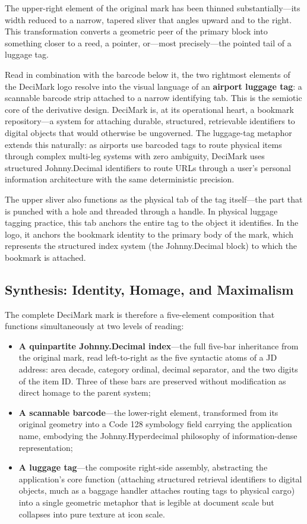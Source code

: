 \documentclass[11pt,a4paper]{book}
\begin{document}
The upper-right element of the original mark has been thinned substantially---its width reduced to a narrow, tapered sliver that angles upward and to the right. This transformation converts a geometric peer of the primary block into something closer to a reed, a pointer, or---most precisely---the pointed tail of a luggage tag.

Read in combination with the barcode below it, the two rightmost elements of the DeciMark logo resolve into the visual language of an \textbf{airport luggage tag}: a scannable barcode strip attached to a narrow identifying tab. This is the semiotic core of the derivative design. DeciMark is, at its operational heart, a bookmark repository---a system for attaching durable, structured, retrievable identifiers to digital objects that would otherwise be ungoverned. The luggage-tag metaphor extends this naturally: as airports use barcoded tags to route physical items through complex multi-leg systems with zero ambiguity, DeciMark uses structured Johnny.Decimal identifiers to route URLs through a user's personal information architecture with the same deterministic precision.

The upper sliver also functions as the physical tab of the tag itself---the part that is punched with a hole and threaded through a handle. In physical luggage tagging practice, this tab anchors the entire tag to the object it identifies. In the logo, it anchors the bookmark identity to the primary body of the mark, which represents the structured index system (the Johnny.Decimal block) to which the bookmark is attached.

\subsection{Synthesis: Identity, Homage, and Maximalism}

The complete DeciMark mark is therefore a five-element composition that functions simultaneously at two levels of reading:

\begin{itemize}
  \item \textbf{A quinpartite Johnny.Decimal index}---the full five-bar inheritance from the original mark, read left-to-right as the five syntactic atoms of a JD address: area decade, category ordinal, decimal separator, and the two digits of the item ID. Three of these bars are preserved without modification as direct homage to the parent system;
  \item \textbf{A scannable barcode}---the lower-right element, transformed from its original geometry into a Code 128 symbology field carrying the application name, embodying the Johnny.Hyperdecimal philosophy of information-dense representation;
  \item \textbf{A luggage tag}---the composite right-side assembly, abstracting the application's core function (attaching structured retrieval identifiers to digital objects, much as a baggage handler attaches routing tags to physical cargo) into a single geometric metaphor that is legible at document scale but collapses into pure texture at icon scale.
\end{itemize}
\end{document}

